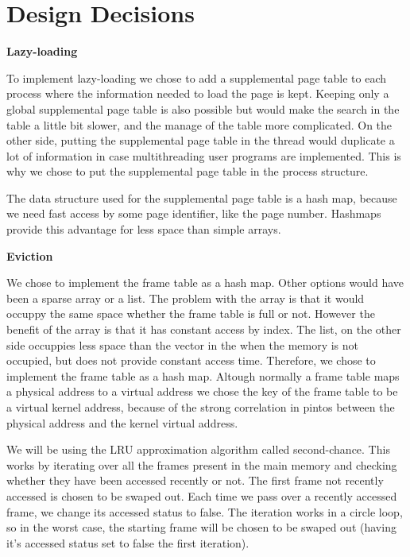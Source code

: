 \begin{lstlisting}

\end{lstlisting}

\section{Design Decisions}

\textbf{Lazy-loading}

To implement lazy-loading we chose to add a supplemental page table to each process where the information needed to load the page is kept. Keeping only a global supplemental page table is also possible but would make the search in the table a little bit slower, and the manage of the table more complicated.
On the other side, putting the supplemental page table in the thread would duplicate a lot of information in case multithreading user programs are implemented. This is why we chose to put the supplemental page table in the process structure.

The data structure used for the supplemental page table is a hash map, because we need fast access by some page identifier, like the page number. Hashmaps provide this advantage for less space than simple arrays.

\textbf{Eviction}

We chose to implement the frame table as a hash map. Other options would have been a sparse array or a list. The problem with the array is that it would occuppy the same space whether the frame table is full or not. However the benefit of the array is that it has constant access by index. The list, on the other side occuppies less space than the vector in the when the memory is not occupied, but does not provide constant access time. Therefore, we chose to implement the frame table as a hash map.
Altough normally a frame table maps a physical address to a virtual address we chose the key of the frame table to be a virtual kernel address, because of the strong correlation in pintos between the physical address and the kernel virtual address.

We will be using the LRU approximation algorithm called second-chance. This works by iterating over all the frames present in the main memory and checking whether they have been accessed recently or not. The first frame not recently accessed is chosen to be swaped out. Each time we pass over a recently accessed frame, we change its accessed status to false. The iteration works in a circle loop, so in the worst case, the starting frame will be chosen to be swaped out (having it's accessed status set to false the first iteration).

